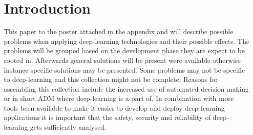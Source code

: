 \section{Introduction}

This paper to the poster attached in the appendix and will describe possible problems when applying deep-learning technologies and their possible effects. The problems will be grouped based on the development phase they are expect to be rooted in. Afterwards general solutions will be present were available otherwise instance specific solutions may be presented. Some problems may not be specific to deep-learning and this collection might not be complete. Reasons for assembling this collection include the increased use of automated decision making or in short ADM where deep-learning is a part of. In combination with more tools been available to make it easier to develop and deploy deep-learning applications it is important that the safety, security and reliability of deep-learning gets sufficiently analysed.